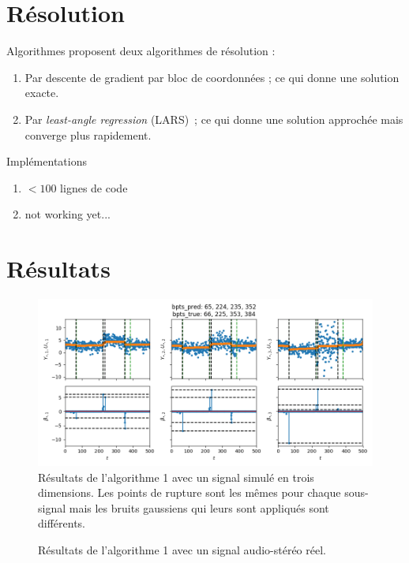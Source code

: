 \documentclass{beamer}
\theoremstyle{definition}
\begin{document}
\section{Résolution}
	\begin{frame}[allowframebreaks]{\insertsection}
		\begin{block}{Algorithmes}
			\citet{gfl} proposent deux algorithmes de résolution :
			\begin{enumerate}
				\item Par descente de gradient par bloc de coordonnées ; ce qui donne une solution exacte.
				\item Par \textit{least-angle regression} (LARS) ; ce qui donne une solution approchée mais converge plus rapidement.
			\end{enumerate}
		\end{block}
	
		\begin{block}{Implémentations}
			\begin{enumerate}
				\item $<100$ lignes de code
				\item not working yet...
			\end{enumerate}
		\end{block}
	\end{frame}

\section{Résultats}
	\begin{frame}[allowframebreaks]{\insertsection}
		\begin{figure}
			\includegraphics[width=1\textwidth]{algo1simu.png}
			\caption{Résultats de l'algorithme 1 avec un signal simulé en trois dimensions. Les points de rupture sont les mêmes pour chaque sous-signal mais les bruits gaussiens qui leurs sont appliqués sont différents.}
			\label{fig:algo1simu}
		\end{figure}
	
		\begin{figure}
			\caption{Résultats de l'algorithme 1 avec un signal audio-stéréo réel.}
			\label{fig:algo1real}
		\end{figure}
	\end{frame}
\end{document}
